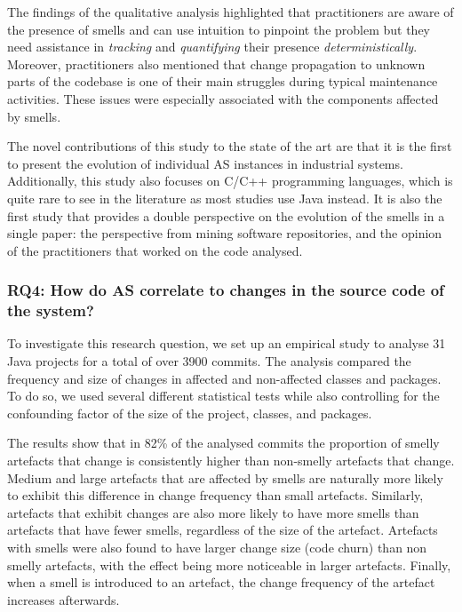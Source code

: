 The findings of the qualitative analysis highlighted that practitioners are aware of the presence of smells and can use intuition to pinpoint the problem but they need assistance in \emph{tracking} and \emph{quantifying} their presence \emph{deterministically}.
Moreover, practitioners also mentioned that change propagation to unknown parts of the codebase is one of their main struggles during typical maintenance activities.
These issues were especially associated with the components affected by smells. 

The novel contributions of this study to the state of the art are that it is the first to present the evolution of individual AS instances in industrial systems. Additionally, this study also focuses on C/C++ programming languages, which is quite rare to see in the literature as most studies use Java instead.
It is also the first study that provides a double perspective on the evolution of the smells in a single paper: the perspective from mining software repositories, and the opinion of the practitioners that worked on the code analysed.

\subsubsection*{RQ4: How do AS correlate to changes in the source code of the system?}
To investigate this research question, we set up an empirical study to analyse 31 Java projects for a total of over 3900 commits.
The analysis compared the frequency and size of changes in affected and non-affected classes and packages.
To do so, we used several different statistical tests while also controlling for the confounding factor of the size of the project, classes, and packages.

The results show that in 82\% of the analysed commits the proportion of smelly artefacts that change is consistently higher than non-smelly artefacts that change.
Medium and large artefacts that are affected by smells are naturally more likely to exhibit this difference in change frequency than small artefacts.
Similarly, artefacts that exhibit changes are also more likely to have more smells than artefacts that have fewer smells, regardless of the size of the artefact.
Artefacts with smells were also found to have larger change size (code churn) than non smelly artefacts, with the effect being more noticeable in larger artefacts.
Finally, when a smell is introduced to an artefact, the change frequency of the artefact increases afterwards.

